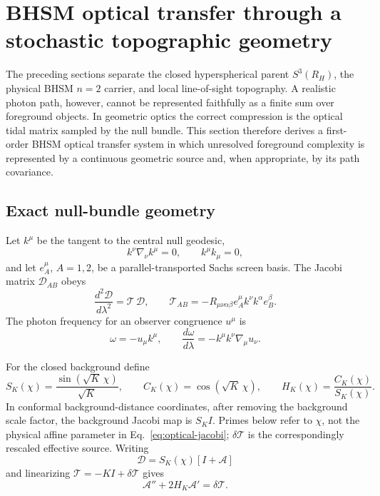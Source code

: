 \section{BHSM optical transfer through a stochastic topographic geometry}
\label{sec:bhsm-optical-transfer}

The preceding sections separate the closed hyperspherical parent
$S^3(R_H)$, the physical BHSM $n=2$ carrier, and local line-of-sight
topography.  A realistic photon path, however, cannot be represented
faithfully as a finite sum over foreground objects.  In geometric optics
the correct compression is the optical tidal matrix sampled by the null
bundle.  This section therefore derives a first-order BHSM optical transfer
system in which unresolved foreground complexity is represented by a
continuous geometric source and, when appropriate, by its path covariance.

\subsection{Exact null-bundle geometry}

Let $k^\mu$ be the tangent to the central null geodesic,
\begin{equation}
k^\nu\nabla_\nu k^\mu=0,
\qquad
k^\mu k_\mu=0,
\end{equation}
and let $e_A^\mu$, $A=1,2$, be a parallel-transported Sachs screen basis.
The Jacobi matrix $\mathcal D_{AB}$ obeys
\begin{equation}
\frac{d^2\mathcal D}{d\lambda^2}
=
\mathcal T\,\mathcal D,
\qquad
\mathcal T_{AB}
=
-
R_{\mu\nu\alpha\beta}
e_A^\mu k^\nu k^\alpha e_B^\beta.
\label{eq:optical-jacobi}
\end{equation}
The photon frequency for an observer congruence $u^\mu$ is
\begin{equation}
\omega=-u_\mu k^\mu,
\qquad
\frac{d\omega}{d\lambda}
=
-k^\mu k^\nu\nabla_\mu u_\nu .
\label{eq:optical-frequency}
\end{equation}

For the closed background define
\begin{equation}
S_K(\chi)=\frac{\sin(\sqrt K\,\chi)}{\sqrt K},
\qquad
C_K(\chi)=\cos(\sqrt K\,\chi),
\qquad
H_K(\chi)=\frac{C_K(\chi)}{S_K(\chi)}.
\end{equation}
In conformal background-distance coordinates, after removing the background scale factor, the background Jacobi map is $S_K I$. Primes below refer to $\chi$, not the physical affine parameter in Eq.~\eqref{eq:optical-jacobi}; $\delta\mathcal T$ is the correspondingly rescaled effective source. Writing
\begin{equation}
\mathcal D=S_K(\chi)[I+\mathcal A]
\end{equation}
and linearizing
$\mathcal T=-KI+\delta\mathcal T$ gives
\begin{equation}
\boxed{
\mathcal A''
+
2H_K\mathcal A'
=
\delta\mathcal T .
}
\label{eq:optical-A}
\end{equation}

